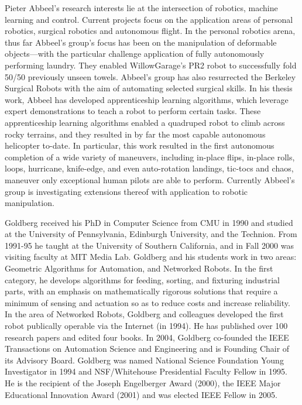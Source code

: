 Pieter Abbeel's research interests lie at the intersection of robotics, machine learning and control. Current
projects focus on the application areas of personal robotics, surgical robotics and autonomous flight.
In the personal robotics arena, thus far Abbeel's group's focus has been on the manipulation of deformable
objects---with the particular challenge application of fully autonomously performing laundry. They
enabled WillowGarage's PR2 robot to successfully fold 50/50 previously unseen towels. Abbeel's group
has also resurrected the Berkeley Surgical Robots with the aim of automating selected surgical skills.
In his thesis work, Abbeel has developed apprenticeship learning algorithms, which leverage expert
demonstrations to teach a robot to perform certain tasks. These apprenticeship learning algorithms enabled
a quadruped robot to climb across rocky terrains, and they resulted in by far the most capable autonomous
helicopter to-date. In particular, this work resulted in the first autonomous completion of a wide variety of
maneuvers, including in-place flips, in-place rolls, loops, hurricane, knife-edge, and even auto-rotation
landings, tic-tocs and chaos, maneuver only exceptional human pilots are able to perform. Currently
Abbeel's group is investigating extensions thereof with application to robotic manipulation.

Goldberg received his PhD in Computer Science from CMU in 1990 and studied at the University of
Pennsylvania, Edinburgh University, and the Technion. From 1991-95 he taught at the University of
Southern California, and in Fall 2000 was visiting faculty at MIT Media Lab. Goldberg and his students
work in two areas: Geometric Algorithms for Automation, and Networked Robots. In the first category, he
develops algorithms for feeding, sorting, and fixturing industrial parts, with an emphasis on mathematically
rigorous solutions that require a minimum of sensing and actuation so as to reduce costs and increase
reliability. In the area of Networked Robots, Goldberg and colleagues developed the first robot publically
operable via the Internet (in 1994). He has published over 100 research papers and edited four books. In
2004, Goldberg co-founded the IEEE Transactions on Automation Science and Engineering and is
Founding Chair of its Advisory Board. Goldberg was named National Science Foundation Young
Investigator in 1994 and NSF/Whitehouse Presidential Faculty Fellow in 1995. He is the recipient of the
Joseph Engelberger Award (2000), the IEEE Major Educational Innovation Award (2001) and was elected
IEEE Fellow in 2005.

\begin{footnotesize}
\begin{multicols}{2}

\end{multicols}
\end{footnotesize}
\newpage